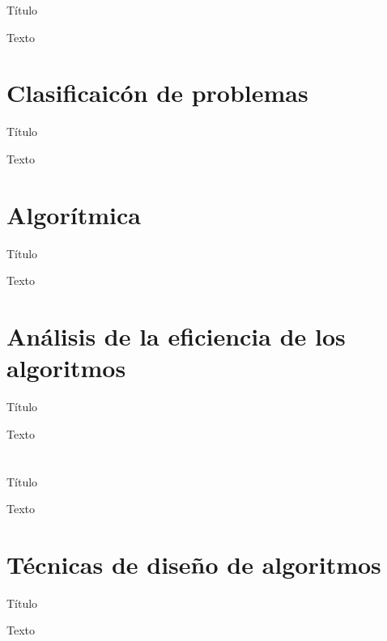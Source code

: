\begin{frame}[c]{Título}
    \begin{center}
        Texto
    \end{center}
\end{frame}

\section{Clasificaicón de problemas}

\begin{frame}[c]{Título}
    \begin{center}
        Texto
    \end{center}
\end{frame}

\section{Algorítmica}

\begin{frame}[c]{Título}
    \begin{center}
        Texto
    \end{center}
\end{frame}

\section{Análisis de la eficiencia de los algoritmos}

\begin{frame}[c]{Título}
    \begin{center}
        Texto
    \end{center}
\end{frame}

\section{}

\begin{frame}[c]{Título}
    \begin{center}
        Texto
    \end{center}
\end{frame}

\section{Técnicas de diseño de algoritmos}

\begin{frame}[c]{Título}
    \begin{center}
        Texto
    \end{center}
\end{frame}
